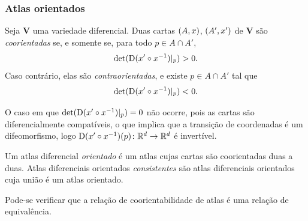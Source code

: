 \subsubsection{Atlas orientados}

\begin{definition}
Seja $\bm V$ uma variedade diferencial. Duas cartas $(A,x)$, $(A',x')$ de $\bm V$ são \emph{coorientadas} se, e somente se, para todo $p \in A \cap A'$,
	\begin{equation*}
	\det(\mathrm{D}(x' \circ x^{-1})|_p) > 0.
	\end{equation*}
Caso contrário, elas são \emph{contraorientadas}, e existe $p \in A \cap A'$ tal que
	\begin{equation*}
	\det(\mathrm{D}(x' \circ x^{-1})|_p) < 0.
	\end{equation*}
\end{definition}

O caso em que $\det(\mathrm{D}(x' \circ x^{-1})|_p) = 0$ não ocorre, pois as cartas são diferencialmente compatíveis, o que implica que a transição de coordenadas é um difeomorfismo, logo $\mathrm{D}(x' \circ x^{-1})(p)\colon \mathbb{R}^d \to \mathbb{R}^d$ é invertível.

\begin{definition}
Um atlas diferencial \emph{orientado} é um atlas cujas cartas são coorientadas duas a duas. Atlas diferenciais orientados \emph{consistentes} são atlas diferenciais orientados cuja união é um atlas orientado.
\end{definition}

Pode-se verificar que a relação de coorientabilidade de atlas é uma relação de equivalência.









